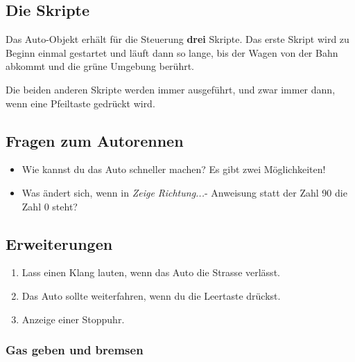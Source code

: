 \documentclass[12pt,a4paper,titlepage]{article}
\begin{document}
\subsection{Die Skripte}
\label{sub:skripte}

Das Auto-Objekt erhält für die Steuerung \textbf{drei} Skripte. Das erste Skript wird zu Beginn einmal gestartet und läuft dann so lange, bis der Wagen von der Bahn abkommt und die grüne Umgebung berührt.

Die beiden anderen Skripte werden immer ausgeführt, und zwar immer dann, wenn eine Pfeiltaste gedrückt wird.

\subsection{Fragen zum Autorennen}

\begin{itemize}
\item Wie kannst du das Auto schneller machen? Es gibt zwei Möglichkeiten!
\item Was ändert sich, wenn in \textit{Zeige Richtung...}- Anweisung statt der Zahl 90 die Zahl 0 steht?
\end{itemize}

\subsection{Erweiterungen}

\begin{enumerate}
\item Lass einen Klang lauten, wenn das Auto die Strasse verlässt.
\item Das Auto sollte weiterfahren, wenn du die Leertaste drückst.
\item Anzeige einer Stoppuhr.
\end{enumerate}

\subsubsection{Gas geben und bremsen}
\end{document}

